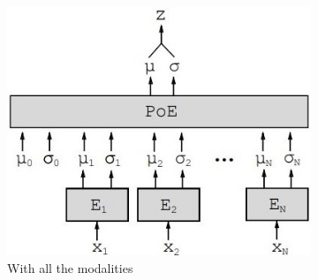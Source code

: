 \documentclass[12pt]{report}
\begin{document}
\begin{figure}[h]
    \centering
    \newlength{\MyOtherHeight}
    \begin{subfigure}[t]{0.49\textwidth}
        \centering
        \includegraphics[width=.9 \textwidth]{images/nn/architectures/mvae_all.jpg}
        \caption{With all the modalities}
        \label{fig:mvae_architecture_all}
    \end{subfigure}
    \hfill
    \begin{subfigure}[t]{0.49\textwidth}
        \centering

\end{subfigure}
\end{figure}
\end{document}
